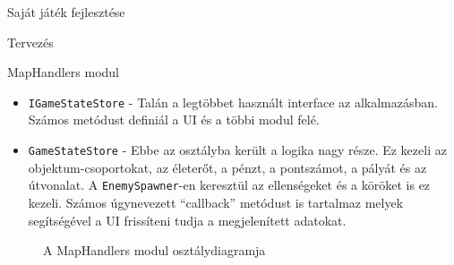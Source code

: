 \begin{MyChapter}{Saját játék fejlesztése}
\begin{MySection}{Tervezés}
\begin{MySubSection}{MapHandlers modul}
\begin{itemize}
				\item \texttt{IGameStateStore} - Talán a legtöbbet használt interface az alkalmazásban. Számos metódust definiál a UI és a többi modul felé.
				
				\item \texttt{GameStateStore} - Ebbe az osztályba került a logika nagy része. Ez kezeli az objektum-csoportokat, az életerőt, a pénzt, a pontszámot, a pályát és az útvonalat. A \texttt{EnemySpawner}-en keresztül az ellenségeket és a köröket is ez kezeli. Számos úgynevezett ``callback'' metódust is tartalmaz melyek segítségével a UI frissíteni tudja a megjelenített adatokat.
			\end{itemize}
		
			\begin{figure}[H]
				\centering
				\caption{A MapHandlers modul osztálydiagramja}
				\label{fig:uml:map}
			\end{figure}
		\end{MySubSection}
	

\end{MySection}
\end{MyChapter}
